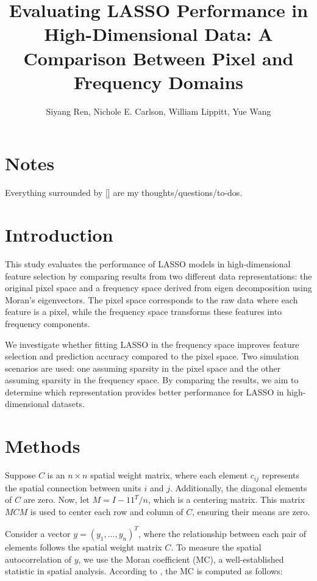 \documentclass[12pt]{article}
\begin{document}
\title{Evaluating LASSO Performance in High-Dimensional Data: A Comparison Between Pixel and Frequency Domains}
\author{Siyang Ren, Nichole E. Carlson, William Lippitt, Yue Wang}
\date{}
\maketitle


\section*{Notes}

Everything surrounded by [] are my thoughts/questions/to-dos.


\section*{Introduction}

This study evaluates the performance of LASSO models in high-dimensional feature selection by comparing results from two different data representations: the original pixel space and a frequency space derived from eigen decomposition using Moran’s eigenvectors. The pixel space corresponds to the raw data where each feature is a pixel, while the frequency space transforms these features into frequency components.

We investigate whether fitting LASSO in the frequency space improves feature selection and prediction accuracy compared to the pixel space. Two simulation scenarios are used: one assuming sparsity in the pixel space and the other assuming sparsity in the frequency space. By comparing the results, we aim to determine which representation provides better performance for LASSO in high-dimensional datasets.


\section*{Methods}

Suppose \( C \) is an \( n \times n \) spatial weight matrix, where each element \( c_{ij} \) represents the spatial connection between units \( i \) and \( j \). Additionally, the diagonal elements of \( C \) are zero. Now, let \( M = I - 1 1^T / n \), which is a centering matrix. This matrix \( MCM \) is used to center each row and column of \( C \), ensuring their means are zero.

Consider a vector \( y = \left( y_1, \dots, y_n \right)^T \), where the relationship between each pair of elements follows the spatial weight matrix \( C \). To measure the spatial autocorrelation of \( y \), we use the Moran coefficient (MC), a well-established statistic in spatial analysis. According to \citet{griffith2014spatial}, the MC is computed as follows:
\end{document}
